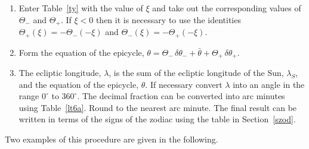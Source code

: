\begin{enumerate}
\item Enter Table~\ref{ty} with the value of $\xi$ and take out
the corresponding values of $\Theta_-$ and $\Theta_+$. If $\xi<0$ then
it is necessary to use the identities $\Theta_+(\xi)=-\Theta_-(-\xi)$
and $\Theta_-(\xi)=-\Theta_+(-\xi)$. 

\item Form the equation of the epicycle, $\theta = \Theta_-\,\delta\theta_-+ \bar{\theta}
+ \Theta_+\,\delta\theta_+$.

\item The ecliptic longitude, $\lambda$, is the sum of the ecliptic longitude of the Sun, $\lambda_S$,   and the equation
of the epicycle, $\theta$. If necessary convert $\lambda$
into  an angle in the range $0^\circ$ to $360^\circ$. The decimal fraction can
be converted into arc minutes
using Table~\ref{lt6a}. Round to the nearest arc minute. The final result
can be written in terms of the signs of the zodiac using the table in Section~\ref{szod}.
\end{enumerate}
Two examples of this procedure are given in the following.

